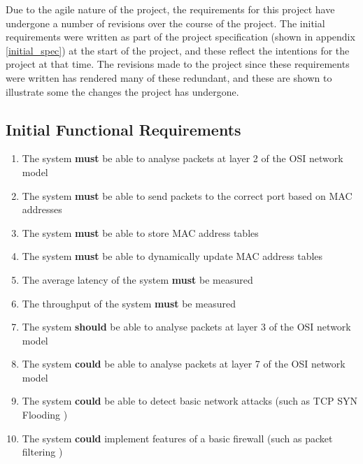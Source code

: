 
Due to the agile nature of the project, the requirements for this project have undergone a number of revisions over the course of the project.
The initial requirements were written as part of the project specification (shown in appendix \ref{initial_spec}) at the start of the project, and these reflect the intentions for the project at that time.
The revisions made to the project since these requirements were written has rendered many of these redundant, and these are shown to illustrate some the changes the project has undergone.

\subsection{Initial Functional Requirements}
\label{initial_functional_requirements}

\begin{enumerate}[label=\textbf{F\arabic*:}]
  \item The system \textbf{must} be able to analyse packets at layer 2 of the OSI network model
  \item The system \textbf{must} be able to send packets to the correct port based on MAC addresses
  \item The system \textbf{must} be able to store MAC address tables
  \item The system \textbf{must} be able to dynamically update MAC address tables
  \item The average latency of the system \textbf{must} be measured
  \item The throughput of the system \textbf{must} be measured
  \item The system \textbf{should} be able to analyse packets at layer 3 of the OSI network model
  \item The system \textbf{could} be able to analyse packets at layer 7 of the OSI network model
  \item The system \textbf{could} be able to detect basic network attacks (such as TCP SYN Flooding \cite{rfc4987})
  \item The system \textbf{could} implement features of a basic firewall (such as packet filtering \cite{rfc2979})
\end{enumerate}

